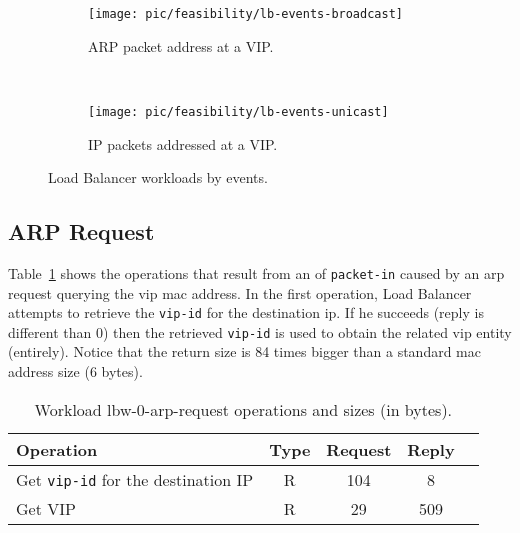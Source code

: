 \begin{figure}
  \centering
  \begin{subfigure}[b]{0.5\textwidth}
                \centering
                \texttt{[image: pic/feasibility/lb-events-broadcast]}
                \caption{ARP packet address at a VIP.}
                \label{fig:lb:interaction:arp2Vip}
        \end{subfigure}%
        ~
        \begin{subfigure}[b]{0.5\textwidth}
                \centering
                \texttt{[image: pic/feasibility/lb-events-unicast]}
                \caption{IP packets addressed at a VIP. }
                \label{fig:lb:interaction:ip2Vip}
        \end{subfigure}
        \caption[Load Balancer workloads]{Load Balancer workloads by events.}  
        \label{fig:lb:interaction}
\end{figure}



\subsection{ARP Request}
Table~\ref{table:lbw-0-arp-request}  shows the operations that result from an \gls{of} \texttt{packet-in} caused by an \gls{arp} request querying the  \gls{vip} \gls{mac} address. 
In the first operation, Load Balancer attempts to retrieve the \texttt{vip-id} for the destination \gls{ip}. If he succeeds (reply is different than 0) then the retrieved \texttt{vip-id} is used to obtain the related \gls{vip} entity (entirely). Notice that the return size is 84 times bigger than a standard \gls{mac} address size (6 bytes). 

\begin{table}[ht]
\small
\centering 
\begin{tabular}{l c c c c}
Operation & Type & Request & Reply \\ \toprule 
Get \texttt{vip-id} for the destination IP  & R & 104 & 8\\
Get VIP  & R & 29 & 509 \\\bottomrule
\end{tabular}\caption[Workload lbw-0-arp-request operations]{Workload lbw-0-arp-request operations and sizes (in bytes).}
\label{table:lbw-0-arp-request}
\end{table}


